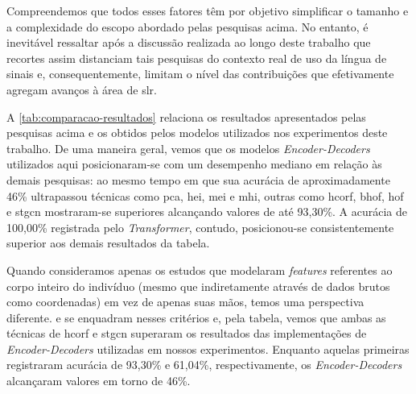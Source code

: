 Compreendemos que todos esses fatores têm por objetivo simplificar o tamanho e a complexidade do escopo abordado pelas pesquisas acima. No entanto, é inevitável ressaltar após a discussão realizada ao longo deste trabalho que recortes assim distanciam tais pesquisas do contexto real de uso da língua de sinais e, consequentemente, limitam o nível das contribuições que efetivamente agregam avanços à área de \acrshort{slr}.







A \autoref{tab:comparacao-resultados} relaciona os resultados apresentados pelas pesquisas acima e os obtidos pelos modelos utilizados nos experimentos deste trabalho.
De uma maneira geral, vemos que os modelos \textit{Encoder-Decoders} utilizados aqui posicionaram-se com um desempenho mediano em relação às demais pesquisas: ao mesmo tempo em que sua acurácia de aproximadamente 46\% ultrapassou técnicas como \acrshort{pca}, \acrshort{hei}, \acrshort{mei} e \acrshort{mhi}, outras como \acrshort{hcorf}, \acrshort{bhof}, \acrshort{hof} e \acrshort{stgcn} mostraram-se superiores alcançando valores de até 93,30\%.
A acurácia de 100,00\% registrada pelo \textit{Transformer}, contudo, posicionou-se consistentemente superior aos demais resultados da tabela.


Quando consideramos apenas os estudos que modelaram \textit{features} referentes ao corpo inteiro do indivíduo (mesmo que indiretamente através de dados brutos como coordenadas) em vez de apenas suas mãos, temos uma perspectiva diferente.  e  se enquadram nesses critérios e, pela tabela, vemos que ambas as técnicas de \acrshort{hcorf} e \acrshort{stgcn} superaram os resultados das implementações de \textit{Encoder-Decoders} utilizadas em nossos experimentos. Enquanto aquelas primeiras registraram acurácia de 93,30\% e 61,04\%, respectivamente, os \textit{Encoder-Decoders} alcançaram valores em torno de 46\%.


